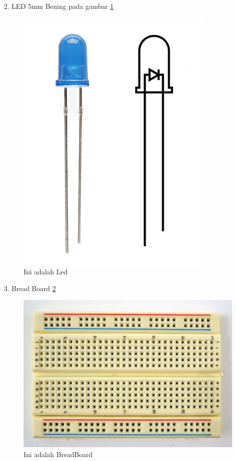  2. LED 5mm Bening pada gambar \ref{fig:led}
  \begin{figure}[ht]
  \centerline{\includegraphics[width=.75\textwidth]{figures/led10.jpg}}
  \caption{Ini adalah Led}
  \label{fig:led}
  \end{figure}

 3. Bread Board
 \ref{fig:brb}
  \begin{figure}[ht]
  \centerline{\includegraphics[width=.75\textwidth]{figures/brb.jpg}}
  \caption{Ini adalah BreadBoard}
  \label{fig:brb}
  \end{figure}

